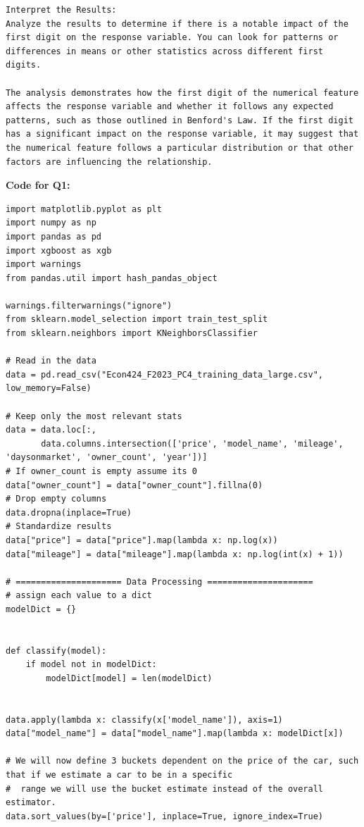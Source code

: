 \documentclass{article}
\begin{document}
\begin{titlepage}
\begin{verbatim}
Interpret the Results:
Analyze the results to determine if there is a notable impact of the first digit on the response variable. You can look for patterns or differences in means or other statistics across different first digits.

The analysis demonstrates how the first digit of the numerical feature affects the response variable and whether it follows any expected patterns, such as those outlined in Benford's Law. If the first digit has a significant impact on the response variable, it may suggest that the numerical feature follows a particular distribution or that other factors are influencing the relationship.
\end{verbatim}
\end{titlepage}
\textbf{Code for Q1:}
\begin{lstlisting}
import matplotlib.pyplot as plt
import numpy as np
import pandas as pd
import xgboost as xgb
import warnings
from pandas.util import hash_pandas_object

warnings.filterwarnings("ignore")
from sklearn.model_selection import train_test_split
from sklearn.neighbors import KNeighborsClassifier

# Read in the data
data = pd.read_csv("Econ424_F2023_PC4_training_data_large.csv", low_memory=False)

# Keep only the most relevant stats
data = data.loc[:,
       data.columns.intersection(['price', 'model_name', 'mileage', 'daysonmarket', 'owner_count', 'year'])]
# If owner_count is empty assume its 0
data["owner_count"] = data["owner_count"].fillna(0)
# Drop empty columns
data.dropna(inplace=True)
# Standardize results
data["price"] = data["price"].map(lambda x: np.log(x))
data["mileage"] = data["mileage"].map(lambda x: np.log(int(x) + 1))

# ===================== Data Processing =====================
# assign each value to a dict
modelDict = {}


def classify(model):
    if model not in modelDict:
        modelDict[model] = len(modelDict)


data.apply(lambda x: classify(x['model_name']), axis=1)
data["model_name"] = data["model_name"].map(lambda x: modelDict[x])

# We will now define 3 buckets dependent on the price of the car, such that if we estimate a car to be in a specific
#  range we will use the bucket estimate instead of the overall estimator.
data.sort_values(by=['price'], inplace=True, ignore_index=True)


\end{lstlisting}
\end{document}
